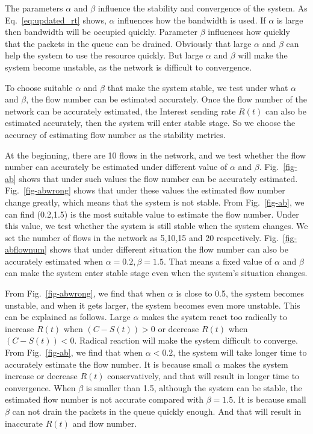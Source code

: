 The parameters $\alpha$ and $\beta$ influence the stability and convergence of the system. As Eq.~\ref{eq:updated_rt} shows, $\alpha$ influences how the bandwidth is used. If $\alpha$ is large then bandwidth will be occupied quickly. Parameter $\beta$ influences how quickly that the packets in the queue can be drained. Obviously that large $\alpha$ and $\beta$ can help the system to use the resource quickly. But large $\alpha$ and $\beta$ will make the system become unstable, as the network is difficult to convergence.

To choose suitable $\alpha$ and $\beta$ that make the system stable, we test under what $\alpha$ and $\beta$, the flow number can be estimated accurately. Once the flow number of the network can be accurately estimated, the Interest sending rate $R(t)$ can also be estimated accurately, then the system will enter stable stage. So we choose the accuracy of estimating flow number as the stability metrics.

At the beginning, there are 10 flows in the network, and we test whether the flow number can accurately be estimated under different value of $\alpha$ and $\beta$. Fig.~\ref{fig-ab} shows that under such values the flow number can be accurately estimated. Fig.~\ref{fig-abwrong} shows that under these values the estimated flow number change greatly, which means that the system is not stable. From Fig.~\ref{fig-ab}, we can find (0.2,1.5) is the most suitable value to estimate the flow number. Under this value, we test whether the system is still stable when the system changes. We set the number of flows in the network as 5,10,15 and 20 respectively. Fig.~\ref{fig-abflownum} shows that under different situation the flow number can also be accurately estimated when $\alpha=0.2,  \beta=1.5$. That means a fixed value of $\alpha$ and $\beta$ can make the system enter stable stage even when the system's situation changes.

From Fig.~\ref{fig-abwrong}, we find that when $\alpha$ is close to 0.5, the system becomes unstable, and when it gets larger, the system becomes even more unstable. This can be explained as follows. Large $\alpha$ makes the system react too radically to increase $R(t)$ when $(C-S(t))>0$ or decrease $R(t)$ when $(C-S(t))<0$. Radical reaction will make the system difficult to converge. From Fig.~\ref{fig-ab}, we find that when $\alpha < 0.2$, the system will take longer time to accurately estimate the flow number. It is because small $\alpha$ makes the system increase or decrease $R(t)$ conservatively, and that will result in longer time to convergence. When $\beta$ is smaller than 1.5, although the system can be stable, the estimated flow number is not accurate compared with $\beta = 1.5$. It is because small $\beta$ can not drain the packets in the queue quickly enough. And that will result in inaccurate $R(t)$ and flow number.

